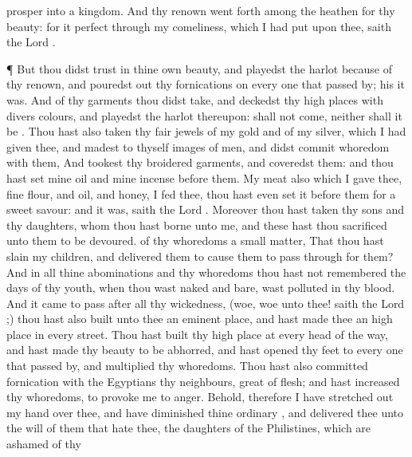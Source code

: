 {prosper into a
kingdom.
And thy
renown went
forth among the
heathen for thy
beauty: for it
{}
perfect through my
comeliness, which I had
put upon thee,
saith the
Lord
{}.
\par }{\PP {}¶ But thou didst
trust in thine own
beauty, and playedst the
harlot because of thy
renown, and pouredst
out thy
fornications on every one that passed
by; his it was.
And of thy
garments thou didst
take, and
deckedst thy high
places with divers
colours, and playedst the
harlot thereupon:
{} shall not
come, neither shall it be
{}.
Thou hast also
taken thy
fair
jewels of my
gold and of my
silver, which I had
given thee, and
madest to thyself
images of
men, and didst commit
whoredom with them,
And
tookest thy
broidered
garments, and
coveredst them: and thou hast
set mine
oil and mine
incense
before them.
My
meat also which I
gave thee, fine
flour, and
oil, and
honey,
{} I
fed thee, thou hast even
set it
before them for a
sweet
savour: and
{} it was,
saith the
Lord
{}.
Moreover thou hast
taken thy
sons and thy
daughters, whom thou hast
borne unto me, and these hast thou
sacrificed unto them to be
devoured.
{} of thy
whoredoms a small
matter,
That thou hast
slain my
children, and
delivered them to cause them to pass
through
{} for them?
And in all thine
abominations and thy
whoredoms thou hast not
remembered the
days of thy
youth, when thou wast
naked and
bare,
{} wast
polluted in thy
blood.
And it came to pass
after all thy
wickedness, (woe,
woe unto thee!
saith the
Lord
{};)
 thou hast also
built unto thee an eminent
place, and hast
made thee an high
place in every
street.
Thou hast
built thy high
place at every
head of the
way, and hast made thy
beauty to be
abhorred, and hast
opened thy
feet to every one that passed
by, and
multiplied thy
whoredoms.
Thou hast also committed
fornication with the
Egyptians thy
neighbours,
great of
flesh; and hast
increased thy
whoredoms, to provoke me to
anger.
Behold, therefore I have stretched
out my
hand over thee, and have
diminished thine
ordinary
{}, and
delivered thee unto the
will of them that
hate thee, the
daughters of the
Philistines, which are
ashamed of thy
}

